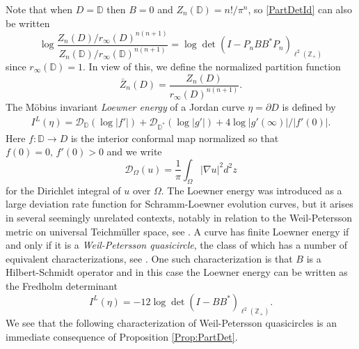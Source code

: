 \documentclass{article}
\numberwithin{equation}{section}
\numberwithin{figure}{section}
\theoremstyle{plain}
\theoremstyle{plain}
\numberwithin{thm}{section}
\theoremstyle{remark}
\newcommand{\D}{\mathbb{D}}
\newcommand{\Z}{\mathbb{Z}}
\begin{document}
Note that when $D=\D$ then $B=0$ and $Z_n(\D)=n!/\pi^n$, so \eqref{PartDetId} can also be written
\begin{equation}\label{PartDetId2}
\log \frac{Z_n(D)/r_\infty(D)^{n(n+1)}}{Z_n(\D)/r_\infty(\D)^{n(n+1)}}=\log \det(I-P_nBB^*P_n)_{\ell^2(\Z_+)}
\end{equation}
since $r_\infty(\D)=1$. In view of this, we define the normalized partition function
\[
\bar{Z}_n(D) = \frac{Z_n(D)}{r_\infty(D)^{n(n+1)}}.
\]
The M\"obius invariant \emph{Loewner energy} \cite{Wa} of a Jordan curve $\eta=\partial D$ is defined by
\begin{align}\label{def:Loewner-energy}
I^L(\eta)= \mathcal{D}_\D(\log|f'|) + \mathcal{D}_{\D^*}(\log|g'|)+ 4 \log |g'(\infty)|/|f'(0)|.
\end{align}
Here $f : \D \to D$ is the interior conformal map normalized so that $f(0)=0, \, f'(0)>0$ and we write
\[
\mathcal{D}_{\Omega}(u) = \frac{1}{\pi} \int_\Omega |\nabla u|^2 d^2z
\]
for the Dirichlet integral of $u$ over $\Omega$. The Loewner energy was introduced as a large deviation rate function for Schramm-Loewner evolution curves, but it arises in several seemingly unrelated contexts, notably in relation to the Weil-Petersson metric on universal Teichm\"uller space, see \cite{Wa, TT, WaSurvey}. A curve has finite Loewner energy if and only if it is a \emph{Weil-Petersson quasicircle}, the class of which has a number of equivalent characterizations, see \cite{Wa, TT, Bi}. One such characterization is that $B$ is a Hilbert-Schmidt operator and in this case the Loewner energy can be written as the Fredholm determinant
\begin{equation}\label{ILDet}
I^L(\eta)=-12\log\det(I-BB^*)_{\ell^2(\Z_+)}.
\end{equation}
We see that the following characterization of Weil-Petersson quasicircles is an immediate consequence of Proposition \ref{Prop:PartDet}.
\end{document}
